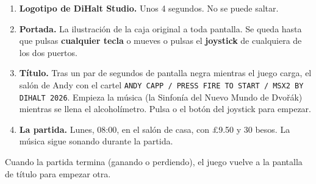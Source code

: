 \begin{enumerate}
\item \textbf{Logotipo de DiHalt Studio.} Unos 4 segundos. No se puede saltar.
\item \textbf{Portada.} La ilustraci\'on de la caja original a toda pantalla. Se queda hasta que pulsas \textbf{cualquier tecla} o mueves o pulsas el \textbf{joystick} de cualquiera de los dos puertos.
\item \textbf{T\'itulo.} Tras un par de segundos de pantalla negra mientras el juego carga, el sal\'on de Andy con el cartel \texttt{ANDY CAPP / PRESS FIRE TO START / MSX2 BY DIHALT 2026}. Empieza la m\'usica (la Sinfon\'ia del Nuevo Mundo de Dvo\v{r}\'ak) mientras se llena el alcohol\'imetro. Pulsa  o el bot\'on del joystick para empezar.
\item \textbf{La partida.} Lunes, 08:00, en el sal\'on de casa, con \pounds 9.50 y 30 besos. La m\'usica sigue sonando durante la partida.
\end{enumerate}

Cuando la partida termina (ganando o perdiendo), el juego vuelve a la pantalla de t\'itulo para empezar otra.
